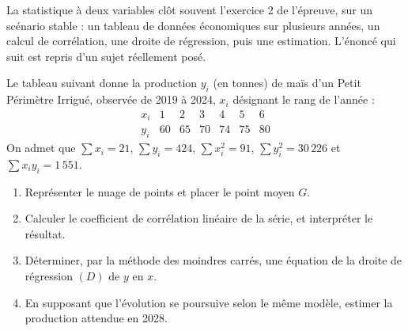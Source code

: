 \begin{annales}
La statistique à deux variables clôt souvent l'exercice 2 de l'épreuve, sur
un scénario stable : un tableau de données économiques sur plusieurs années,
un calcul de corrélation, une droite de régression, puis une estimation.
L'énoncé qui suit est repris d'un sujet réellement posé.

Le tableau suivant donne la production $y_{i}$ (en tonnes) de maïs d'un Petit
Périmètre Irrigué, observée de 2019 à 2024, $x_{i}$ désignant le rang de
l'année :
\[
  \begin{array}{c|cccccc}
    x_{i} & 1 & 2 & 3 & 4 & 5 & 6 \\
    \hline
    y_{i} & 60 & 65 & 70 & 74 & 75 & 80
  \end{array}
\]
On admet que $\sum x_{i} = 21$, $\sum y_{i} = 424$, $\sum x_{i}^{2} = 91$,
$\sum y_{i}^{2} = 30\,226$ et $\sum x_{i}y_{i} = 1\,551$.
\begin{enumerate}[label=\textbf{\arabic*.}, leftmargin=*, itemsep=0.2em]
  \item Représenter le nuage de points et placer le point moyen $G$.
  \item Calculer le coefficient de corrélation linéaire de la série, et
        interpréter le résultat.
  \item Déterminer, par la méthode des moindres carrés, une équation de la
        droite de régression $(D)$ de $y$ en $x$.
  \item En supposant que l'évolution se poursuive selon le même modèle,
        estimer la production attendue en 2028.
\end{enumerate}


\end{annales}
